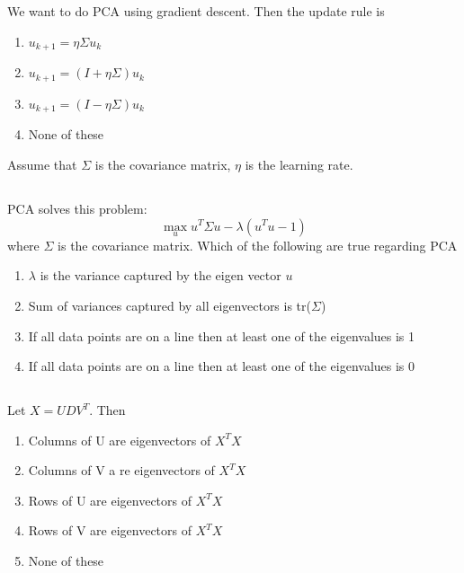 \begin{frame}
\section{}
We want to do PCA using gradient descent. Then the update rule is
\begin{enumerate}
\item $u_{k+1} = \eta\Sigma u_k$
\item $u_{k+1} = (I+\eta\Sigma)u_k$   %
\item $u_{k+1} = (I-\eta\Sigma)u_k$
\item None of these
\end{enumerate}
Assume that $\Sigma$ is the covariance matrix, $\eta$ is the learning rate.
\end{frame}

\begin{frame}
\section{}
PCA solves this problem:
\[\max_u u^T \Sigma u - \lambda (u^Tu-1)\]
where $\Sigma$ is the covariance matrix.
Which of the following are true regarding PCA
\begin{enumerate}
\item $\lambda$ is the variance captured by the eigen vector $u$    %
\item Sum of variances captured by all eigenvectors is tr($\Sigma$)   %
\item If all data points are on a line then at least one of the eigenvalues is 1
\item If all data points are on a line then at least one of the eigenvalues is 0    %
\end{enumerate}
\end{frame}

\begin{frame}
\section{}
Let $X=UDV^T$. Then
\begin{enumerate}
\item Columns of U are eigenvectors of $X^TX$
\item Columns of V a re eigenvectors of $X^TX$    %
\item Rows of U are eigenvectors of $X^TX$
\item Rows of V are eigenvectors of $X^TX$
\item None of these
\end{enumerate}
\end{frame}


